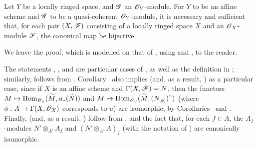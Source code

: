 \begin{corollary}[1.8.10]
\label{I.1.8.10}
Let $Y$ be a locally ringed space, and $\mathscr{G}$ an $\mathscr{O}_Y$-module.
For $Y$ to be an affine scheme and $\mathscr{G}$ to be a quasi-coherent $\mathscr{O}_Y$-module, it is necessary and sufficient that, for each pair $(X,\mathscr{F})$ consisting of a locally ringed space $X$ and an $\mathscr{O}_X$-module $\mathscr{F}$, the canonical map  be bijective.
\end{corollary}

We leave the proof, which is modelled on that of , using  and , to the reader.

\begin{remark}[1.8.11]
\label{I.1.8.11}
The statements , , and  are particular cases of , as well as the definition in ;
similarly,  follows from .
Corollary~ also implies  (and, as a result, ) as a particular case, since if $X$ is an affine scheme and $\Gamma(X,\mathscr{F})=N$, then the functors $M\mapsto\Hom_{\sh{O}_S}(\widetilde{M},u_*(\widetilde{N}))$ and $M\mapsto\Hom_{\sh{O}_S}(\widetilde{M},(N_{[\vphi]})\supertilde)$ (where $\vphi:A\to\Gamma(X,\sh{O}_X)$ corresponds to $u$) are isomorphic, by Corollaries~ and .
Finally,  (and, as a result, ) follow from , and the fact that, for each $f\in A$, the $A_f$-modules $N'\otimes_{A'}A_f$ and $(N'\otimes_{A'}A)_f$ (with the notation of ) are canonically isomorphic.
\end{remark}

